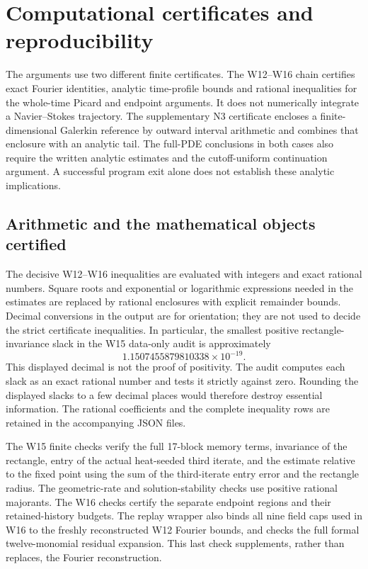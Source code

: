 \section{Computational certificates and reproducibility}
\label{cert:section}

The arguments use two different finite certificates.  The W12--W16 chain
certifies exact Fourier identities, analytic time-profile bounds and rational
inequalities for the whole-time Picard and endpoint arguments.  It does not
numerically integrate a Navier--Stokes trajectory.  The supplementary N3
certificate encloses a finite-dimensional Galerkin reference by outward
interval arithmetic and combines that enclosure with an analytic tail.  The
full-PDE conclusions in both cases also require the written analytic estimates
and the cutoff-uniform continuation argument.  A successful program exit alone
does not establish these analytic implications.

\subsection{Arithmetic and the mathematical objects certified}

The decisive W12--W16 inequalities are evaluated with integers and exact
rational numbers.  Square roots and exponential or logarithmic expressions
needed in the estimates are replaced by rational enclosures with explicit
remainder bounds.  Decimal conversions in the output are for orientation;
they are not used to decide the strict certificate inequalities.  In
particular, the smallest positive rectangle-invariance slack in the W15
data-only audit is approximately
\[
  1.1507455879810338\times 10^{-19}.
\]
This displayed decimal is not the proof of positivity.  The audit computes
each slack as an exact rational number and tests it strictly against zero.
Rounding the displayed slacks to a few decimal places would therefore destroy
essential information.  The rational coefficients and the complete inequality
rows are retained in the accompanying JSON files.

The W15 finite checks verify the full 17-block memory terms, invariance of the
rectangle, entry of the actual heat-seeded third iterate, and the estimate
relative to the fixed point using the sum of the third-iterate entry error and
the rectangle radius.  The geometric-rate and solution-stability checks use
positive rational majorants.  The W16 checks certify the separate endpoint
regions and their retained-history budgets.  The replay wrapper also binds
all nine field caps used in W16 to the freshly reconstructed W12 Fourier
bounds, and checks the full formal twelve-monomial residual expansion.  This
last check supplements, rather than replaces, the Fourier reconstruction.

